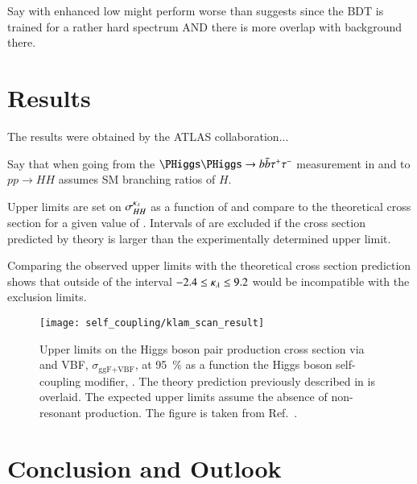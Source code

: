 Say \klambda with enhanced low \mHH might perform worse than
\AccTimesEff suggests since the BDT is trained for a rather hard \mHH
spectrum AND there is more overlap with background there.


\section{Results}%
\label{sec:reinterpretation_results}


The results were obtained by the ATLAS collaboration...

Say that when going from the $\HH \to \bbbar\tautau$ measurement in
\lephad and \hadhad to $pp \to HH$ assumes SM branching ratios of $H$.

Upper limits are set on $\sigma_{HH}^{\kappa_{\lambda}}$ as a function of
\klambda and compare to the theoretical cross section for a given
value of \klambda. Intervals of \klambda are excluded if the cross
section predicted by theory is larger than the experimentally
determined upper limit.

Comparing the observed upper limits with the theoretical cross section
prediction shows that \klambda outside of the interval
$-2.4 \leq \kappa_{\lambda} \leq 9.2$ would be incompatible with the exclusion
limits.


\begin{figure}[htbp]
  \centering

  \texttt{[image: self\_coupling/klam\_scan\_result]}

  \caption{Upper limits on the Higgs boson pair production cross
    section via \ggF and VBF, $\sigma_{\text{ggF+VBF}}$, at
    \SI{95}{\percent} \CLs as a function the Higgs boson self-coupling
    modifier, \klambda. The theory prediction previously described in
     is overlaid. The expected upper limits
    assume the absence of non-resonant \HH production. The figure is
    taken from Ref.~\cite{ATLAS-CONF-2021-052}.}%
  \label{fig:klambda_scan}
\end{figure}


\section{Conclusion and Outlook}%
\label{sec:reinterpretation_conclusion}


